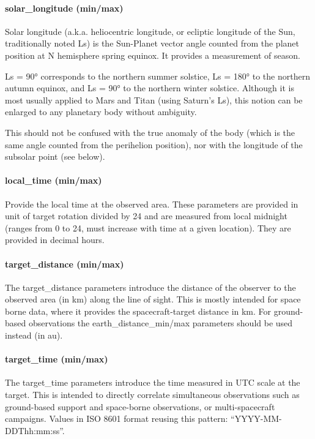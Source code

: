 \documentclass[11pt,a4paper]{ivoa}
\begin{document}
\paragraph{solar\_longitude (min/max)}

Solar longitude (a.k.a. heliocentric longitude, or ecliptic longitude of the Sun, traditionally noted Ls) is the Sun-Planet vector angle counted from the planet position at N hemisphere spring equinox. It provides a measurement of season.

Ls = 90° corresponds to the northern summer solstice, Ls = 180° to the northern autumn equinox, and Ls = 90° to the northern winter solstice. Although it is most usually applied to Mars and Titan (using Saturn's Ls), this notion can be enlarged to any planetary body without ambiguity.

This should not be confused with the true anomaly of the body (which is the same angle counted from the perihelion position), nor with the longitude of the subsolar point (see below).

\paragraph{local\_time (min/max)}

Provide the local time at the observed area. These parameters are provided in unit of target rotation divided by 24 and are measured from local midnight (ranges from 0 to 24, must increase with time at a given location). They are provided in decimal hours.

\paragraph{target\_distance (min/max)}

The target\_distance parameters introduce the distance of the observer to the observed area (in km) along the line of sight. This is mostly intended for space borne data, where it provides the spacecraft-target distance in km. For ground-based observations the earth\_distance\_min/max parameters should be used instead (in au).

\paragraph{target\_time (min/max)}

The target\_time parameters introduce the time measured in UTC scale at the target. This is intended to directly correlate simultaneous observations such as ground-based support and space-borne observations, or multi-spacecraft campaigns. Values in ISO 8601 format reusing this pattern: “YYYY-MM-DDThh:mm:ss”. 
\end{document}
